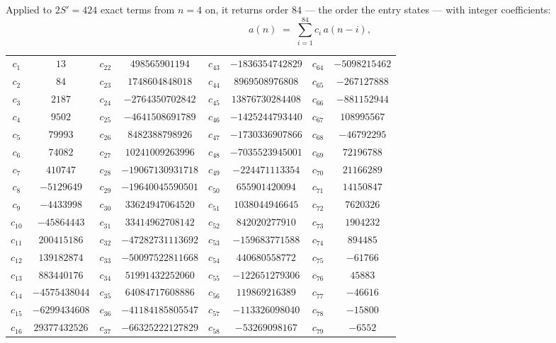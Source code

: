 \documentclass[11pt,a4paper]{article}
\theoremstyle{plain}
\theoremstyle{definition}
\begin{document}
Applied to $2S'=424$ exact terms from $n=4$ on, it returns order $84$ --- the
order the entry states --- with integer coefficients:
\[
a(n)\;=\;\sum_{i=1}^{84}c_i\,a(n-i),
\]
\begin{center}\small
\begin{tabular}{cccccccc}
$c_{1}$ & $13$ & $c_{22}$ & $498565901194$ & $c_{43}$ & $-1836354742829$ & $c_{64}$ & $-5098215462$ \\
$c_{2}$ & $84$ & $c_{23}$ & $1748604848018$ & $c_{44}$ & $8969508976808$ & $c_{65}$ & $-267127888$ \\
$c_{3}$ & $2187$ & $c_{24}$ & $-2764350702842$ & $c_{45}$ & $13876730284408$ & $c_{66}$ & $-881152944$ \\
$c_{4}$ & $9502$ & $c_{25}$ & $-4641508691789$ & $c_{46}$ & $-1425244793440$ & $c_{67}$ & $108995567$ \\
$c_{5}$ & $79993$ & $c_{26}$ & $8482388798926$ & $c_{47}$ & $-1730336907866$ & $c_{68}$ & $-46792295$ \\
$c_{6}$ & $74082$ & $c_{27}$ & $10241009263996$ & $c_{48}$ & $-7035523945001$ & $c_{69}$ & $72196788$ \\
$c_{7}$ & $410747$ & $c_{28}$ & $-19067130931718$ & $c_{49}$ & $-224471113354$ & $c_{70}$ & $21166289$ \\
$c_{8}$ & $-5129649$ & $c_{29}$ & $-19640045590501$ & $c_{50}$ & $655901420094$ & $c_{71}$ & $14150847$ \\
$c_{9}$ & $-4433998$ & $c_{30}$ & $33624947064520$ & $c_{51}$ & $1038044946645$ & $c_{72}$ & $7620326$ \\
$c_{10}$ & $-45864443$ & $c_{31}$ & $33414962708142$ & $c_{52}$ & $842020277910$ & $c_{73}$ & $1904232$ \\
$c_{11}$ & $200415186$ & $c_{32}$ & $-47282731113692$ & $c_{53}$ & $-159683771588$ & $c_{74}$ & $894485$ \\
$c_{12}$ & $139182874$ & $c_{33}$ & $-50097522811668$ & $c_{54}$ & $440680558772$ & $c_{75}$ & $-61766$ \\
$c_{13}$ & $883440176$ & $c_{34}$ & $51991432252060$ & $c_{55}$ & $-122651279306$ & $c_{76}$ & $45883$ \\
$c_{14}$ & $-4575438044$ & $c_{35}$ & $64084717608886$ & $c_{56}$ & $119869216389$ & $c_{77}$ & $-46616$ \\
$c_{15}$ & $-6299434608$ & $c_{36}$ & $-41184185805547$ & $c_{57}$ & $-113326098040$ & $c_{78}$ & $-15800$ \\
$c_{16}$ & $29377432526$ & $c_{37}$ & $-66325222127829$ & $c_{58}$ & $-53269098167$ & $c_{79}$ & $-6552$ \\

\end{tabular}
\end{center}
\end{document}
